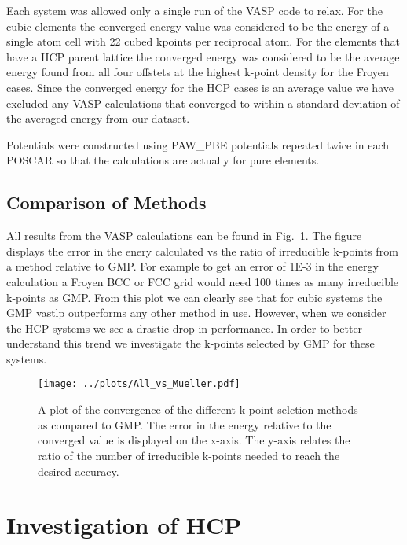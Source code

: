\documentclass[12pt,prb,reprint]{revtex4-1}
\begin{document}
Each system was allowed only a single run of the VASP code to
relax. For the cubic elements the converged energy value was
considered to be the energy of a single atom cell with 22 cubed
kpoints per reciprocal atom. For the elements that have a HCP parent
lattice the converged energy was considered to be the average energy
found from all four offstets at the highest k-point density for the
Froyen cases. {\color{red}Since the converged energy for the HCP cases is an
average value we have excluded any VASP calculations that converged to
within a standard deviation of the averaged energy from our dataset.}

Potentials were constructed using PAW\_PBE potentials repeated twice
in each POSCAR so that the calculations are actually for pure
elements. 

\subsection{Comparison of Methods} \label{comparison}

All results from the VASP calculations can be found in
Fig.~\ref{fig:AllvGMP}. The figure displays the error in the enery
calculated vs the ratio of irreducible k-points from a method relative
to GMP. For example to get an error of 1E-3 in the energy calculation
a Froyen BCC or FCC grid would need 100 times as many irreducible
k-points as GMP. From this plot we can clearly see that for cubic
systems the GMP vastlp outperforms any other method in use. However,
when we consider the HCP systems we see a drastic drop in
performance. In order to better understand this trend we investigate
the k-points selected by GMP for these systems.

\begin{figure} %
  \texttt{[image: ../plots/All\_vs\_Mueller.pdf]}
  \centering
  \caption{A plot of the convergence of the different k-point selction
    methods as compared to GMP. The error in the energy relative to
    the converged value is displayed on the x-axis. The y-axis relates
    the ratio of the number of irreducible k-points needed to reach
    the desired accuracy.}
  \label{fig:AllvGMP}
\end{figure}

\section{Investigation of HCP} \label{HCP}

\end{document}
